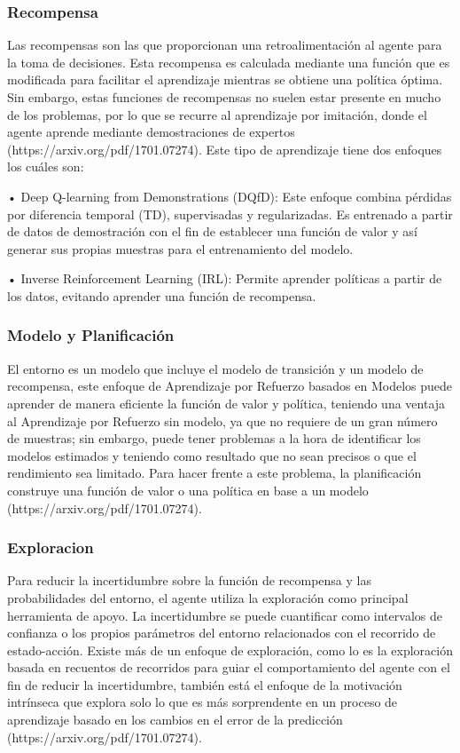 \subsubsection{Recompensa}
Las recompensas son las que proporcionan una retroalimentación al agente para la toma de decisiones. Esta recompensa es calculada mediante una función que es modificada para facilitar el aprendizaje mientras se obtiene una política óptima. Sin embargo, estas funciones de recompensas no suelen estar presente en mucho de los problemas, por lo que se recurre al aprendizaje por imitación, donde el agente aprende mediante demostraciones de expertos (https://arxiv.org/pdf/1701.07274). Este tipo de aprendizaje tiene dos enfoques los cuáles son:

•	Deep Q-learning from Demonstrations (DQfD): Este enfoque combina pérdidas por diferencia temporal (TD), supervisadas y regularizadas. Es entrenado a partir de datos de demostración con el fin de establecer una función de valor y así generar sus propias muestras para el entrenamiento del modelo.

•	Inverse Reinforcement Learning (IRL): Permite aprender políticas a partir de los datos, evitando aprender una función de recompensa.


\subsubsection{Modelo y Planificación}
El entorno es un modelo que incluye el modelo de transición y un modelo de recompensa, este enfoque de Aprendizaje por Refuerzo basados en Modelos puede aprender de manera eficiente la función de valor y política, teniendo una ventaja al Aprendizaje por Refuerzo sin modelo, ya que no requiere de un gran número de muestras; sin embargo, puede tener problemas a la hora de identificar los modelos estimados y teniendo como resultado que no sean precisos o que el rendimiento sea limitado. Para hacer frente a este problema, la planificación construye una función de valor o una política en base a un modelo (https://arxiv.org/pdf/1701.07274).

\subsubsection{Exploracion}
Para reducir la incertidumbre sobre la función de recompensa y las probabilidades del entorno, el agente utiliza la exploración como principal herramienta de apoyo. La incertidumbre se puede cuantificar como intervalos de confianza o los propios parámetros del entorno relacionados con el recorrido de estado-acción. Existe más de un enfoque de exploración, como lo es la exploración basada en recuentos de recorridos para guiar el comportamiento del agente con el fin de reducir la incertidumbre, también está el enfoque de la motivación intrínseca que explora solo lo que es más sorprendente en un proceso de aprendizaje basado en los cambios en el error de la predicción (https://arxiv.org/pdf/1701.07274).

